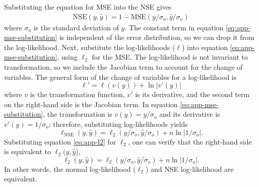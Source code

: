\documentclass{article}
\begin{document}
Substituting the equation for MSE into the NSE gives
\begin{align}
  \text{NSE}(y, \hat{y}) = 1 - \text{MSE}(y / \sigma_o, \hat{y} / \sigma_o)
  \label{eq:app-mse-substitution}
\end{align}
where $\sigma_o$ is the standard deviation of $y$.
The constant term in equation \ref{eq:app-mse-substitution} is independent of the error distribution,
so we can drop it from the log-likelihood.
Next, substitute the log-likelihoods ($\ell$) into equation \ref{eq:app-mse-substitution}, 
using $\ell_2$ for the MSE.
The log-likelihood is not invariant to transformation,
so we include the Jacobian term to account for the change of variables.
The general form of the change of variables for a log-likelihood is
\begin{equation}
  \ell' = \ell(v(y)) + \ln | v'(y) |
\end{equation}
where $v$ is the transformation function, 
$v'$ is its derivative,
and the second term on the right-hand side is the Jacobian term.
In equation \ref{eq:app-mse-substitution},
the transformation is $v(y) = y / \sigma_o$ and its derivative is $v'(y) = 1 / \sigma_o$;
therefore, substituting log-likelihoods yields
\begin{equation}
  \ell_{\text{NSE}}(y, \hat{y}) = \ell_2(y / \sigma_o, \hat{y} / \sigma_o) + n \ln | 1 / \sigma_o | \text{.}
  \label{eq:app-l2-substitution}
\end{equation}
Substituting equation \ref{eq:app-l2} for $\ell_2$,
one can verify that the right-hand side is equivalent to $\ell_2(y, \hat{y}$),
\begin{equation}
  \ell_2(y, \hat{y}) = \ell_2(y / \sigma_o, \hat{y} / \sigma_o) + n \ln | 1 / \sigma_o | \text{.}
\end{equation}
In other words, the normal log-likelihood ($\ell_2$) and NSE log-likelihood are equivalent.
\end{document}
